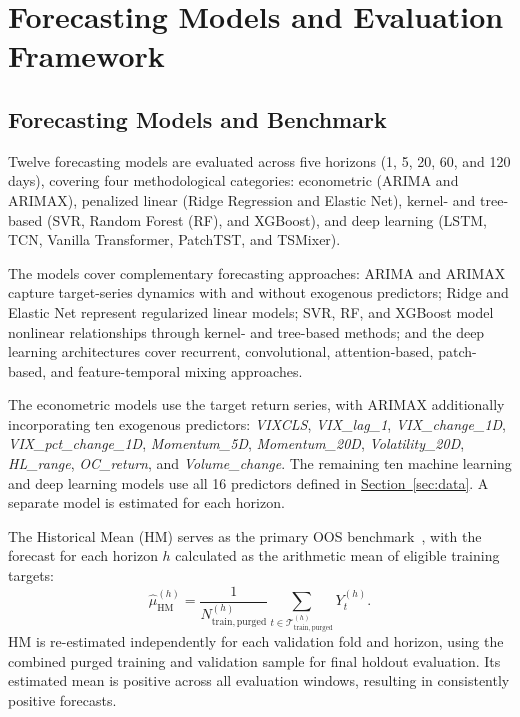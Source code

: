 \documentclass[runningheads,orivec]{llncs}
\begin{document}
\section{Forecasting Models and Evaluation Framework}\label{sec:methodology}

\subsection{Forecasting Models and Benchmark}\label{subsec:models_benchmark}

Twelve forecasting models are evaluated across five horizons (1, 5, 20, 60, and 120 days), covering four methodological categories: econometric (ARIMA and ARIMAX), penalized linear (Ridge Regression and Elastic Net), kernel- and tree-based (SVR, Random Forest (RF), and XGBoost), and deep learning (LSTM, TCN, Vanilla Transformer, PatchTST, and TSMixer).

The models cover complementary forecasting approaches: ARIMA and ARIMAX capture target-series dynamics with and without exogenous predictors; Ridge and Elastic Net represent regularized linear models; SVR, RF, and XGBoost model nonlinear relationships through kernel- and tree-based methods; and the deep learning architectures cover recurrent, convolutional, attention-based, patch-based, and feature-temporal mixing approaches.

The econometric models use the target return series, with ARIMAX additionally incorporating ten exogenous predictors: \textit{VIXCLS}, \textit{VIX\_lag\_1}, \textit{VIX\_change\_1D}, \textit{VIX\_pct\_change\_1D}, \textit{Momentum\_5D}, \textit{Momentum\_20D}, \textit{Volatility\_20D}, \textit{HL\_range}, \textit{OC\_return}, and \textit{Volume\_change}. The remaining ten machine learning and deep learning models use all 16 predictors defined in \hyperref[sec:data]{Section~\ref*{sec:data}}. A separate model is estimated for each horizon.

The Historical Mean (HM) serves as the primary OOS benchmark~\cite{welch2008}, with the forecast for each horizon $h$ calculated as the arithmetic mean of eligible training targets:
\begin{equation}\label{eq:historical_mean}
\widehat{\mu}_{\mathrm{HM}}^{(h)}
=
\frac{1}{N_{\mathrm{train,purged}}^{(h)}}
\sum_{t\in \mathcal{T}_{\mathrm{train,purged}}^{(h)}}
Y_t^{(h)}.
\end{equation}
HM is re-estimated independently for each validation fold and horizon, using the combined purged training and validation sample for final holdout evaluation. Its estimated mean is positive across all evaluation windows, resulting in consistently positive forecasts.
\end{document}
